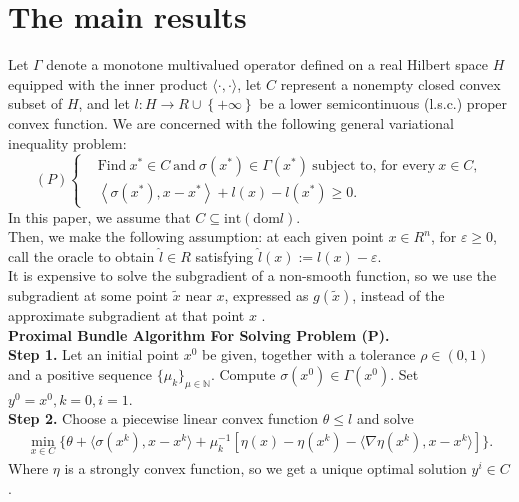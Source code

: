 \documentclass[12pt]{llncs}
\begin{document}
\section{The main results}
Let $\Gamma$ denote a monotone multivalued operator defined on a real Hilbert space $H$ equipped with the inner product $\langle \cdot,\cdot \rangle$, let $C$ represent a nonempty closed convex subset of $H$, and let $l:H\to R\cup\left \{ +  \infty  \right \} $ be a lower semicontinuous (l.s.c.) proper convex function. We are concerned with the following general variational inequality problem:
 \begin{equation}
              (P)\left\{
              \begin{array}{ll}
                 &  \text{Find} ~ x^{*}\in C\  \text{and}\  \sigma(x^{*})\in \Gamma(x^{*}) ~ \text{subject to, for every}\  x\in C,\\
                 & \left \langle \sigma(x^{*}),x-x^{*} \right \rangle +l(x)-l(x^{*})\ge 0.
              \end{array}
             \right.
             \nonumber
  \end{equation}
In this paper, we assume that $C\subseteq \text{int}(\text{dom} l)$. \\
\indent Then, we make the following assumption: at each given point $x\in R^{n}$, for $\varepsilon\geq 0$, call the oracle to obtain $\hat{l} \in R$ satisfying $\hat{l} (x):=l(x)-\varepsilon$.\\
\indent It is expensive to solve the subgradient of a non-smooth function, so we use the subgradient at some point $\tilde{x}$ near $x$, expressed as $g(\tilde{x})$, instead of the approximate subgradient at that point $x$ .\\
\textbf{Proximal Bundle Algorithm For Solving Problem (P).}\\
\textbf{Step 1.} Let an initial point $x^{0}$ be given, together with a tolerance $\rho\in(0, 1)$ and a positive sequence $\{\mu_{k}\}_{\mu\in\mathbb{N} }$. Compute $\sigma(x^{0})\in \Gamma(x^{0})$. Set $y^{0}=x^{0}, k=0,i=1$.\\
\textbf{Step 2.} Choose a piecewise linear convex function $\theta\leq l$ and solve
$$
\begin{aligned}
\min_{x \in C}  \{\theta+ \langle \sigma(x^{k}),x-x^{k}\rangle+\mu_{k}^{-1}[ \eta(x)-\eta(x^{k})-\langle\nabla \eta(x^{k}),x-x^{k}\rangle]\}.
\end{aligned}
$$
Where $\eta$ is a strongly convex function, so we get a unique optimal solution $y^{i}\in C$.\\
\end{document}
